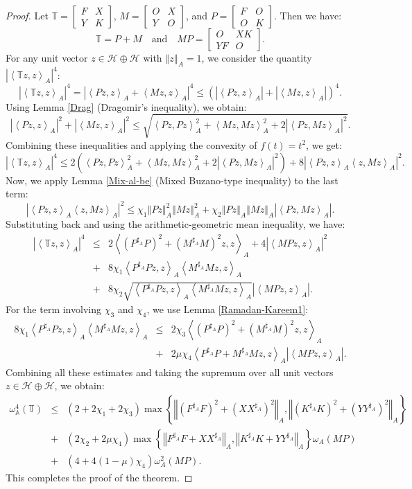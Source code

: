 \documentclass{article}
\newcommand{\seqA}[1]{{\left<#1\right>}_{A}}
\newcommand{\normA}[1]{{\left\Vert#1\right\Vert}_{A}}
\newcommand{\abs}[1]{\left\vert#1\right\vert}
\newcommand{\set}[1]{\left\{#1\right\}}
\newcommand {\A}{\mathbb{A}}
\newcommand {\Ma}{M^{\sharp_{A}}}
\newcommand {\T}{\mathbb{T}}
\newcommand {\h}{\mathcal{H}}
\newcommand {\Xa}{X^{\sharp_{A}}}
\newcommand {\Ya}{Y^{\sharp_{A}}}
\newcommand {\Ka}{K^{\sharp_{A}}}
\newcommand {\Fa}{F^{\sharp_{A}}}
\newcommand {\Pa}{P^{\sharp_{A}}}
\begin{document}
\begin{proof}
Let $\T = \begin{bmatrix} F & X \\ Y & K \end{bmatrix}$, $M = \begin{bmatrix} O & X \\ Y & O \end{bmatrix}$, and $P = \begin{bmatrix} F & O \\ O & K \end{bmatrix}$. Then we have:
\[
\T = P + M \quad \text{and} \quad MP = \begin{bmatrix} O & XK \\ YF & O \end{bmatrix}.
\]
For any unit vector $z \in \h \oplus \h$ with $\normA{z} = 1$, we consider the quantity $\abs{\seqA{\T z, z}}^4$:
\[
\abs{\seqA{\T z, z}}^4 = \abs{\seqA{Pz, z} + \seqA{Mz, z}}^4 \leq \left(\abs{\seqA{Pz, z}} + \abs{\seqA{Mz, z}}\right)^4.
\]
Using Lemma \ref{Drag} (Dragomir's inequality), we obtain:
\[
\abs{\seqA{Pz, z}}^2 + \abs{\seqA{Mz, z}}^2 \leq \sqrt{\seqA{Pz, Pz}^2 + \seqA{Mz, Mz}^2 + 2\abs{\seqA{Pz, Mz}}^2}.
\]
Combining these inequalities and applying the convexity of $f(t) = t^2$, we get:
\[
\abs{\seqA{\T z, z}}^4 \leq 2\left(\seqA{Pz, Pz}^2 + \seqA{Mz, Mz}^2 + 2\abs{\seqA{Pz, Mz}}^2\right) + 8\abs{\seqA{Pz, z}\seqA{z, Mz}}^2.
\]
Now, we apply Lemma \ref{Mix-al-be} (Mixed Buzano-type inequality) to the last term:
\[
\abs{\seqA{Pz, z}\seqA{z, Mz}}^2 \leq \chi_1 \normA{Pz}^2 \normA{Mz}^2 + \chi_2 \normA{Pz} \normA{Mz} \abs{\seqA{Pz, Mz}}.
\]
Substituting back and using the arithmetic-geometric mean inequality, we have:
\begin{eqnarray*}
  \abs{\seqA{\T z, z}}^4  &\leq&  2\seqA{(\Pa P)^2 + (\Ma M)^2 z, z} + 4\abs{\seqA{MP z, z}}^2 \\
   &+&8\chi_1 \seqA{\Pa P z, z} \seqA{\Ma M z, z} \\
  &+&8\chi_2 \sqrt{\seqA{\Pa P z, z} \seqA{\Ma M z, z}} \abs{\seqA{MP z, z}}.
\end{eqnarray*}
For the term involving $\chi_3$ and $\chi_4$, we use Lemma \ref{Ramadan-Kareem1}:
\begin{eqnarray*}
  8\chi_1 \seqA{\Pa P z, z} \seqA{\Ma M z, z} &\leq&2\chi_3 \seqA{(\Pa P)^2 + (\Ma M)^2 z, z} \\
   &+&2\mu\chi_4 \seqA{\Pa P + \Ma M z, z} \abs{\seqA{MP z, z}}.
\end{eqnarray*}
Combining all these estimates and taking the supremum over all unit vectors $z \in \h \oplus \h$, we obtain:
\begin{eqnarray*}
  \omega_{\A}^4(\T) &\leq&(2 + 2\chi_1 + 2\chi_3)\max\set{\normA{(\Fa F)^2 + (X\Xa)^2}, \normA{(\Ka K)^2 + (Y\Ya)^2}}  \\
   &+& (2\chi_2 + 2\mu\chi_4)\max\set{\normA{\Fa F + X\Xa}, \normA{\Ka K + Y\Ya}} \omega_A(MP)\\
   &+&(4 + 4(1 - \mu)\chi_4 )\omega_A^2(MP).
\end{eqnarray*}
This completes the proof of the theorem.
\end{proof}
\end{document}
